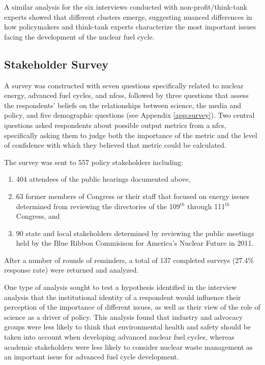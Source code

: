 A similar analysis for the six interviews conducted with non-profit/think-tank
experts showed that different clusters emerge, suggesting nuanced differences
in how policymakers and think-tank experts characterize the most important
issues facing the development of the nuclear fuel cycle.

\subsection{Stakeholder Survey}

A survey was constructed with seven questions specifically related to nuclear
energy, advanced fuel cycles, and \glspl{nfcs}, followed by three questions
that assess the respondents' beliefs on the relationships between science, the
media and policy, and five demographic questions (see Appendix
\ref{app:survey}).  Two central questions asked respondents about possible
output metrics from a \gls{nfcs}, specifically asking them to judge both the
importance of the metric and the level of confidence with which they believed
that metric could be calculated.

The survey was sent to 557 policy stakeholders including:
\begin{enumerate}
\item 404 attendees of the public hearings documented above, 
\item 63 former members of Congress or their staff that focused on energy issues determined from reviewing the directories of the 109$^{th}$ through 111$^{th}$ Congress, and
\item 90 state and local stakeholders determined by reviewing the public
  meetings held by the Blue Ribbon Commisison for America's Nuclear Future in
  2011.
\end{enumerate}
After a number of rounds of reminders, a total of 137 completed surveys
(27.4\% response rate) were returned and analyzed.

One type of analysis sought to test a hypothesis identified in the interview
analysis that the institutional identity of a respondent would influence their
perception of the importance of different issues, as well as their view of the
role of science as a driver of policy.  This analysis found that industry and
advocacy groups were less likely to think that environmental health and safety
should be taken into account when developing advanced nuclear fuel cycles,
whereas academic stakeholders were less likely to consider nuclear waste
management as an important issue for advanced fuel cycle development.

